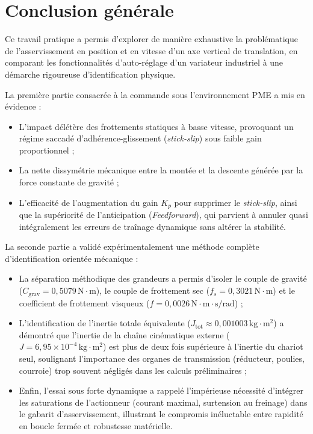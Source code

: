 \documentclass[12pt,a4paper]{article}
\begin{document}
\section*{Conclusion générale}

Ce travail pratique a permis d'explorer de manière exhaustive la problématique de l'asservissement en position et en vitesse d'un axe vertical de translation, en comparant les fonctionnalités d'auto-réglage d'un variateur industriel à une démarche rigoureuse d'identification physique.

La première partie consacrée à la commande sous l'environnement PME a mis en évidence :
\begin{itemize}
    \item L'impact délétère des frottements statiques à basse vitesse, provoquant un régime saccadé d'adhérence-glissement (\textit{stick-slip}) sous faible gain proportionnel ;
    \item La nette dissymétrie mécanique entre la montée et la descente générée par la force constante de gravité ;
    \item L'efficacité de l'augmentation du gain $K_p$ pour supprimer le \textit{stick-slip}, ainsi que la supériorité de l'anticipation (\textit{Feedforward}), qui parvient à annuler quasi intégralement les erreurs de traînage dynamique sans altérer la stabilité.
\end{itemize}

La seconde partie a validé expérimentalement une méthode complète d'identification orientée mécanique :
\begin{itemize}
    \item La séparation méthodique des grandeurs a permis d'isoler le couple de gravité ($C_{\text{grav}} = 0{,}5079\,\text{N}\cdot\text{m}$), le couple de frottement sec ($f_s = 0{,}3021\,\text{N}\cdot\text{m}$) et le coefficient de frottement visqueux ($f = 0{,}0026\,\text{N}\cdot\text{m}\cdot\text{s/rad}$) ;
    \item L'identification de l'inertie totale équivalente ($J_{\text{tot}} \approx 0{,}001003\,\text{kg}\cdot\text{m}^2$) a démontré que l'inertie de la chaîne cinématique externe ($J = 6{,}95 \times 10^{-4}\,\text{kg}\cdot\text{m}^2$) est plus de deux fois supérieure à l'inertie du chariot seul, soulignant l'importance des organes de transmission (réducteur, poulies, courroie) trop souvent négligés dans les calculs préliminaires ;
    \item Enfin, l'essai sous forte dynamique a rappelé l'impérieuse nécessité d'intégrer les saturations de l'actionneur (courant maximal, surtension au freinage) dans le gabarit d'asservissement, illustrant le compromis inéluctable entre rapidité en boucle fermée et robustesse matérielle.
\end{itemize}
\end{document}
